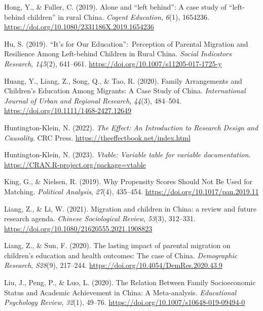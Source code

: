 \documentclass[
  man,floatsintext]{apa7}
\newlength{\cslhangindent}
\newlength{\cslentryspacingunit} %
\newenvironment{CSLReferences}[2] %
 {%
  \setlength{\parindent}{0pt}
  \ifodd #1
  \let\oldpar\par
  \def\par{\hangindent=\cslhangindent\oldpar}
  \fi
  \setlength{\parskip}{#2\cslentryspacingunit}
 }%
 {}
\begin{document}
\begin{CSLReferences}{1}{0}
\leavevmode{}%
Hong, Y., \& Fuller, C. (2019). Alone and {``}left behind{''}: A case study of {``}left-behind children{''} in rural {China}. \emph{Cogent Education}, \emph{6}(1), 1654236. \url{https://doi.org/10.1080/2331186X.2019.1654236}

\leavevmode{}%
Hu, S. (2019). {``}It{'}s for Our Education{''}:~Perception of Parental Migration and Resilience Among Left-behind Children in Rural {China}. \emph{Social Indicators Research}, \emph{145}(2), 641--661. \url{https://doi.org/10.1007/s11205-017-1725-y}

\leavevmode{}%
Huang, Y., Liang, Z., Song, Q., \& Tao, R. (2020). Family Arrangements and Children's Education Among Migrants: A Case Study of {China}. \emph{International Journal of Urban and Regional Research}, \emph{44}(3), 484--504. \url{https://doi.org/10.1111/1468-2427.12649}

\leavevmode{}%
Huntington-Klein, N. (2022). \emph{The Effect: An Introduction to Research Design and Causality}. CRC Press. \url{https://theeffectbook.net/index.html}

\leavevmode{}%
Huntington-Klein, N. (2023). \emph{Vtable: Variable table for variable documentation}. \url{https://CRAN.R-project.org/package=vtable}

\leavevmode{}%
King, G., \& Nielsen, R. (2019). Why Propensity Scores Should Not Be Used for Matching. \emph{Political Analysis}, \emph{27}(4), 435--454. \url{https://doi.org/10.1017/pan.2019.11}

\leavevmode{}%
Liang, Z., \& Li, W. (2021). Migration and children in {China}: a review and future research agenda. \emph{Chinese Sociological Review}, \emph{53}(3), 312--331. \url{https://doi.org/10.1080/21620555.2021.1908823}

\leavevmode{}%
Liang, Z., \& Sun, F. (2020). The lasting impact of parental migration on children's education and health outcomes: The case of {China}. \emph{Demographic Research}, \emph{S28}(9), 217--244. \url{https://doi.org/10.4054/DemRes.2020.43.9}

\leavevmode{}%
Liu, J., Peng, P., \& Luo, L. (2020). The Relation Between Family Socioeconomic Status and Academic Achievement in {China}: A Meta-analysis. \emph{Educational Psychology Review}, \emph{32}(1), 49--76. \url{https://doi.org/10.1007/s10648-019-09494-0}


\end{CSLReferences}
\end{document}
